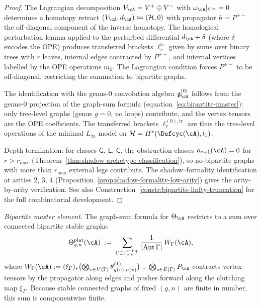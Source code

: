 \begin{proof}
The Lagrangian decomposition
$V_\cA = V^+ \oplus V^-$ with
$\omega_\cA|_{V^\pm} = 0$ determines a homotopy retract
$(V_\cA, d_\cA) \leftrightharpoons (\mathcal{H}, 0)$ with
propagator $h = P^{+-}$ the off-diagonal component
of the inverse homotopy.  The homological perturbation
lemma applied to the perturbed differential
$d_\cA + \delta$ (where $\delta$ encodes the OPE)
produces transferred brackets $\ell_r^{\mathrm{tr}}$
given by sums over binary trees with $r$ leaves,
internal edges contracted by $P^{+-}$, and internal
vertices labelled by the OPE operations $m_k$.
The Lagrangian condition forces $P^{+-}$ to be
off-diagonal, restricting the summation to bipartite
graphs.

The identification with the genus-$0$ convolution algebra
$\mathfrak{g}^{(0)}_\cA$ follows from the genus-$0$
projection of the graph-sum formula
(equation~\eqref{eq:bipartite-master}): only tree-level
graphs (genus $g = 0$, no loops) contribute, and the
vertex tensors are the OPE coefficients.  The transferred
brackets $\ell_r^{(0),\mathrm{tr}}$ are thus the
tree-level operations of the minimal $L_\infty$ model on
$\mathcal{H} = H^*(\Defcyc(\cA), l_1)$.

Depth termination: for classes $\mathsf{G}$, $\mathsf{L}$,
$\mathsf{C}$, the obstruction classes $o_{r+1}(\cA) = 0$
for $r > r_{\max}$
(Theorem~\ref{thm:shadow-archetype-classification}), so
no bipartite graphs with more than $r_{\max}$ external legs
contribute.
The shadow--formality identification at arities $2$, $3$, $4$
(Proposition~\ref{prop:shadow-formality-low-arity}) gives the
arity-by-arity verification.
See also Construction~\ref{constr:bipartite-linfty-truncation}
for the full combinatorial development.
\end{proof}

\begin{remark}
\label{rem:mc2-bipartite-master}
\emph{Bipartite master element.}
The graph-sum formula for $\Theta_\cA$ restricts to a sum
over connected bipartite stable graphs:
\begin{equation}\label{eq:bipartite-master}
\Theta^{\mathrm{plat}}_{g,n}(\cA)
\;:=\;
\sum_{\Gamma \in \Gamma^{\mathrm{st,bip}}_{g,n}}
\frac{1}{|\mathrm{Aut}\,\Gamma|}\,
W_\Gamma(\cA),
\end{equation}
where
$W_\Gamma(\cA)
:= (\xi_\Gamma)_*
\bigl(\bigotimes_{v \in V(\Gamma)}
\theta^{(1)}_{g(v),n(v)}\bigr)
\;\lrcorner\;
\bigotimes_{e \in E(\Gamma)} P_\cA$
contracts vertex tensors by the propagator along edges and
pushes forward along the clutching map $\xi_\Gamma$.
Because stable connected graphs of fixed $(g,n)$ are finite in
number, this sum is componentwise finite.
\end{remark}

